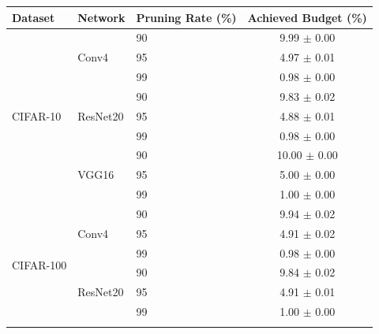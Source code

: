 \begin{table}
  \centering
  \begin{tabular}{lllc}
    \toprule
    \textbf{Dataset}          & \textbf{Network}          & \textbf{Pruning Rate} (\%) &
    \textbf{Achieved Budget} (\%)                                                                         \\
    \midrule
    \multirow{9}{*}{CIFAR-10}  & \multirow{3}{*}{Conv4}    & 90                         & 9.99 $\pm$ 0.00  \\
                              &                           & 95                         & 4.97 $\pm$ 0.01  \\
                              &                           & 99                         & 0.98 $\pm$ 0.00  \\
    \cline{2-4}
                              & \multirow{3}{*}{ResNet20} & 90                         & 9.83 $\pm$ 0.02  \\
                              &                           & 95                         & 4.88 $\pm$ 0.01  \\
                              &                           & 99                         & 0.98 $\pm$ 0.00  \\
    \cline{2-4}

                              & \multirow{3}{*}{VGG16}    & 90                         & 10.00 $\pm$ 0.00 \\
                              &                           & 95                         & 5.00 $\pm$ 0.00  \\
                              &                           & 99                         & 1.00 $\pm$ 0.00  \\
    \midrule
    \multirow{9}{*}{CIFAR-100} & \multirow{3}{*}{Conv4}    & 90                         & 9.94 $\pm$ 0.02  \\
                              &                           & 95                         & 4.91 $\pm$ 0.02  \\
                              &                           & 99                         & 0.98 $\pm$ 0.00  \\
    \cline{2-4}

                              & \multirow{3}{*}{ResNet20} & 90                         & 9.84 $\pm$ 0.02  \\
                              &                           & 95                         & 4.91 $\pm$ 0.01  \\
                              &                           & 99                         & 1.00 $\pm$ 0.00  \\
    \cline{2-4}


\end{tabular}
\end{table}
